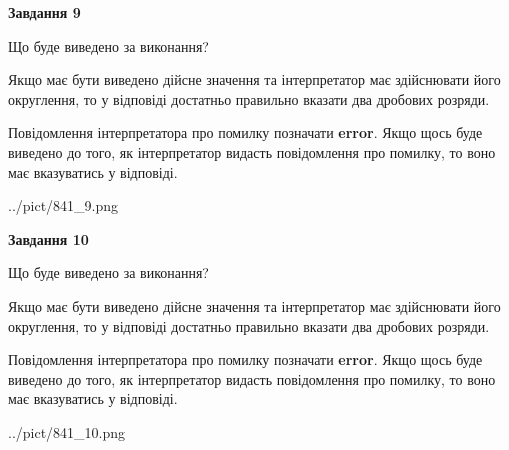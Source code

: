\documentclass[12pt, ukrainian]{article}
\begin{document}
{\begin {Large}
{\begin {center}\textbf{Завдання 9}\end {center}}\par
Що буде виведено за виконання? \par

Якщо має бути виведено дійсне значення та інтерпретатор має здійснювати його округлення, 
то у відповіді достатньо правильно вказати два дробових розряди.

Повідомлення інтерпретатора про помилку позначати \textbf{error}.
Якщо щось буде виведено до того, як інтерпретатор видасть повідомлення про помилку, 
то воно має вказуватись у відповіді. \par

\begin{center}
	{../pict/841_9.png}
\end{center}
\newpage

{\begin {center}\textbf{Завдання 10}\end {center}}\par
Що буде виведено за виконання? \par

Якщо має бути виведено дійсне значення та інтерпретатор має здійснювати його округлення, 
то у відповіді достатньо правильно вказати два дробових розряди.

Повідомлення інтерпретатора про помилку позначати \textbf{error}.
Якщо щось буде виведено до того, як інтерпретатор видасть повідомлення про помилку, 
то воно має вказуватись у відповіді. \par

\begin{center}
	{../pict/841_10.png}
\end{center}
\newpage

\end {Large}}
\end{document}
